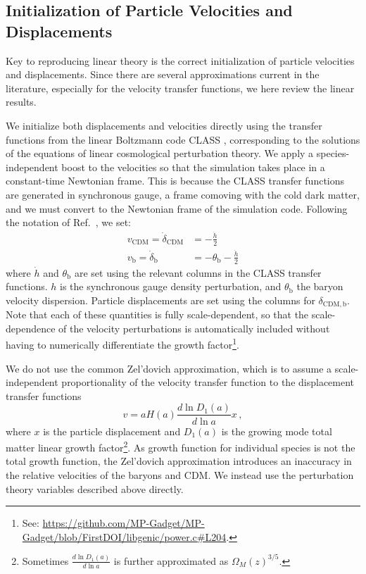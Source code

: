 \documentclass[a4paper,11pt]{article}
\begin{document}
\subsection{Initialization of Particle Velocities and Displacements}
\label{sec:particles}

Key to reproducing linear theory is the correct initialization of particle velocities and displacements. Since there are several approximations current in the literature, especially for the velocity transfer functions, we here review the linear results.

We initialize both displacements and velocities directly using the transfer functions from the linear Boltzmann code CLASS \cite{CLASS}, corresponding to the solutions of the equations of linear cosmological perturbation theory. We apply a species-independent boost to the velocities so that the simulation takes place in a constant-time Newtonian frame. This is because the CLASS transfer functions are generated in synchronous gauge, a frame comoving with the cold dark matter, and we must convert to the Newtonian frame of the simulation code. Following the notation of Ref.~\cite{Ma:1995}, we set:
\begin{align}
 v_\mathrm{CDM} = \dot{\delta}_\mathrm{CDM}  &= - \frac{\dot{h}}{2} \\
 v_\mathrm{b} = \dot{\delta}_\mathrm{b}  &= - \theta_\mathrm{b} - \frac{\dot{h}}{2}
\end{align}
where $\dot{h}$ and $\theta_\mathrm{b}$ are set using the relevant columns in the CLASS transfer functions. $h$ is the synchronous gauge density perturbation, and $\theta_\mathrm{b}$ the baryon velocity dispersion.
Particle displacements are set using the columns for $\delta_\mathrm{CDM, b}$. Note that each of these quantities is fully scale-dependent, so that the scale-dependence of the velocity perturbations is automatically included without having to numerically differentiate the growth factor\footnote{See: \protect\url{https://github.com/MP-Gadget/MP-Gadget/blob/FirstDOI/libgenic/power.c\#L204}.}.

We do not use the common Zel'dovich approximation, which is to assume a scale-independent proportionality of the velocity transfer function to the displacement transfer functions
\begin{equation*}
 v = a H(a) \frac{d \ln D_1(a)}{d \ln a} x\,,
\end{equation*}
where $x$ is the particle displacement and $D_1(a)$ is the growing mode total matter linear growth factor\footnote{Sometimes $\frac{d \ln D_1(a)}{d \ln a}$ is further approximated as $\Omega_M(z)^{3/5}$.}. As growth function for individual species is not the total growth function, the Zel'dovich approximation introduces an inaccuracy in the relative velocities of the baryons and CDM. We instead use the perturbation theory variables described above directly.
\end{document}
